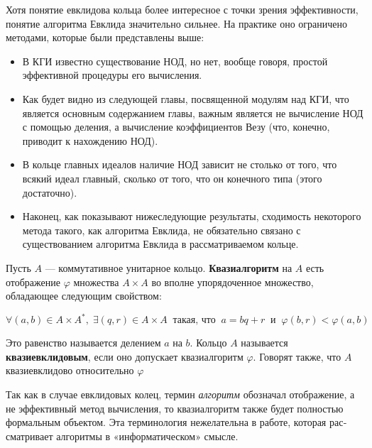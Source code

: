 \documentclass{mai_book}
\begin{document}
Хотя понятие евклидова кольца более интересное с точки зрения
эффективности, понятие алгоритма Евклида значительно сильнее. На
практике оно ограничено методами, которые были представлены выше:
\begin{itemize}


\item В КГИ известно существование НОД, но нет, вообще говоря, простой эффективной процедуры его вычисления.

\item Как будет видно из следующей главы, посвященной модулям над
КГИ, что является основным содержанием главы, важным явля­ется не вычисление НОД с помощью деления, а вычисление коэф­фициентов Везу (что, конечно, приводит к нахождению НОД).

\item В кольце главных идеалов наличие НОД зависит не столько от то­го, что всякий идеал главный, сколько от того, что он конечного
типа (этого достаточно).
\newpage
\item Наконец, как показывают нижеследующие результаты, сходи­мость некоторого метода такого, как алгоритма Евклида, не обязательно связано с существованием алгоритма Евклида в рассма­триваемом кольце.
\end{itemize}
\begin{determ}
\hspace*{0.5cm}
Пусть $A$ — коммутативное унитарное кольцо. \textbf{Квазиалгоритм} на $A$ есть отображение $\varphi$ множества $A\times A$ во вполне упорядоченное множество, обладающее следующим свойством:
\begin{center}
$\forall(a,b)\in A\times A^*,\; \exists(q,r)\in A\times A\;\;\text{такая, что}\;\;a = bq + r\;\;\text{и}\;\;\varphi(b,r)<\varphi(a,b)$
\end{center}
Это равенство называется делением $a$ на $b$. Кольцо $A$ называется \textbf{квазиевклидовым}, если оно допускает квазиалгоритм $\varphi$. Говорят также, что $A$ квазиевклидово относительно $\varphi$
\end{determ}
\begin{mynote}
Так как в случае евклидовых колец, термин \textit{алгоритм} обозначал отображение, а не эффективный метод вычисления, то квазиалгоритм также будет полностью формальным объектом. Эта терминология нежелательна в работе, которая рас­сматривает алгоритмы в «информатическом» смысле.
\end{mynote}
\end{document}
